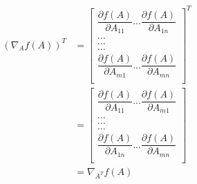 \begin{equation}
\begin{split}
  (\nabla_{A}f(A))^{T} &=
  \begin{bmatrix}
    \dfrac{\partial f(A)}{\partial A_{11}} ... \dfrac{\partial f(A)}{\partial A_{1n}} \\
    . .   .\\
    .  .  .\\
    .   . .\\
    \dfrac{\partial f(A)}{\partial A_{m1}} ... \dfrac{\partial f(A)}{\partial A_{mn}} \\
  \end{bmatrix}^{T} \\
    &=
  \begin{bmatrix}
    \dfrac{\partial f(A)}{\partial A_{11}} ... \dfrac{\partial f(A)}{\partial A_{m1}} \\
    . .   .\\
    .  .  .\\
    .   . .\\
    \dfrac{\partial f(A)}{\partial A_{1n}} ... \dfrac{\partial f(A)}{\partial A_{mn}} \\
  \end{bmatrix} \\
  &=
  \nabla_{A^{T}}f(A)
\end{split}
\end{equation}
